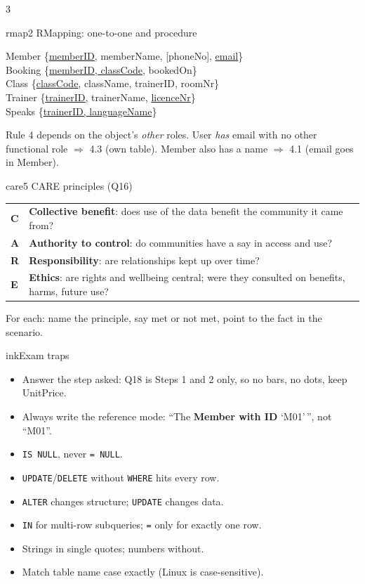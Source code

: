 \documentclass[9pt]{extarticle}
\newcommand{\sub}[2][ink]{\par\smallskip{\color{#1}\bfseries #2}\par\nobreak\vspace{1pt}}
\newcommand{\code}[1]{\texttt{\small #1}}
\begin{document}
\begin{multicols*}{3}
\begin{topic}{rmap}{2 \quad RMapping: one-to-one and procedure}
\sub[rmap]{FitHub, mapped}
{\ttfamily\footnotesize
Member \{\underline{\underline{memberID}}, memberName, [phoneNo], \underline{email}\}\\
Booking \{\underline{memberID, classCode}, bookedOn\}\\
Class \{\underline{classCode}, className, trainerID, roomNr\}\\
Trainer \{\underline{\underline{trainerID}}, trainerName, \underline{licenceNr}\}\\
Speaks \{\underline{trainerID, languageName}\}}
\begin{trap}
Rule 4 depends on the object's \emph{other} roles. User \emph{has} email with no other functional role $\Rightarrow$ 4.3 (own table). Member also has a name $\Rightarrow$ 4.1 (email goes in Member).
\end{trap}
\end{topic}

\begin{topic}{care}{5 \quad CARE principles (Q16)}
\begin{tabularx}{\linewidth}{@{}>{\bfseries}l X@{}}
C & \textbf{Collective benefit}: does use of the data benefit the community it came from? \\
A & \textbf{Authority to control}: do communities have a say in access and use? \\
R & \textbf{Responsibility}: are relationships kept up over time? \\
E & \textbf{Ethics}: are rights and wellbeing central; were they consulted on benefits, harms, future use? \\
\end{tabularx}
For each: name the principle, say met or not met, point to the fact in the scenario.
\end{topic}

\begin{topic}{ink}{Exam traps}
\begin{itemize}
  \item Answer the step asked: Q18 is Steps 1 and 2 only, so no bars, no dots, keep UnitPrice.
  \item Always write the reference mode: ``The \textbf{Member with ID} `M01'\,'', not ``M01''.
  \item \code{IS NULL}, never \code{= NULL}.
  \item \code{UPDATE}/\code{DELETE} without \code{WHERE} hits every row.
  \item \code{ALTER} changes structure; \code{UPDATE} changes data.
  \item \code{IN} for multi-row subqueries; \code{=} only for exactly one row.
  \item Strings in single quotes; numbers without.
  \item Match table name case exactly (Linux is case-sensitive).
\end{itemize}
\end{topic}


\end{multicols*}
\end{document}
